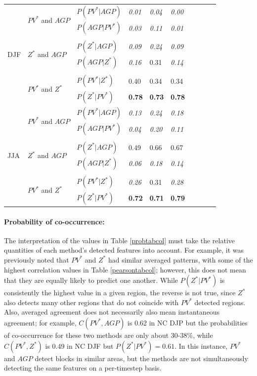 \documentclass[smallextended]{svjour3}       %
\numberwithin{equation}{section}
\begin{document}
\begin{table}
\begin{tabular}{|l|l|l|l|l|l|l|l|l|l|}
  \hline
  \multirow{8}{*}{DJF} 
   & \multirow{2}{*}{$PV^* $ and $AGP$}&$P(PV^*|AGP)$ & \textit{{0.01}} & \textit{{0.04} }& \textit{{0.00}} \\
   & & $P(AGP|PV^*)$ & \textit{{0.03}} & \textit{0.11}& \textit{{0.01}} \\ 
      &&&&&\\
   & \multirow{2}{*}{$Z^*$ and $AGP$} &$P(Z^*|AGP)$  & \textit{0.09} & \textit{{0.24}} & \textit{0.09} \\ 
   &&$P(AGP|Z^*)$  & \textit{{0.16} }& {{0.31} }& \textit{{0.14} }\\ 
      &&&&&\\
      & \multirow{2}{*}{$PV^*$ and $Z^*$ } &$P(PV^*|Z^*)$    & {0.40} & {0.34} & {0.34} \\
   &&$P(Z^*|PV^*)$   &\textbf{0.78} & \textbf{0.73} & \textbf{0.78} \\   
   \hline
\multirow{8}{*}{JJA} 
   & \multirow{2}{*}{$PV^* $ and $AGP$}&$P(PV^*|AGP)$ & \textit{0.13} & \textit{0.24} & \textit{0.18} \\  
   & & $P(AGP|PV^*)$  &\textit{{0.04}} & \textit{{0.20}} & \textit{{0.11}} \\ 
   &&&&&\\
   & \multirow{2}{*}{$Z^*$ and $AGP$} &$P(Z^*|AGP)$  & {0.49} & {0.66} & {0.67} \\  
   &&$P(AGP|Z^*)$    & \textit{{0.06}} & \textit{{0.18}} & \textit{{0.14}} \\ 
      &&&&&\\
      & \multirow{2}{*}{$PV^*$ and $Z^*$ } &$P(PV^*|Z^*)$    & \textit{{0.26}} & {{0.31}}& \textit{{0.28}} \\ 
   &&$P(Z^*|PV^*)$   & \textbf{{0.72}} & {\textbf{0.71}} & \textbf{0.79} \\ 
   
  \hline
\end{tabular}
\end{table}

\paragraph{Probability of co-occurrence:} The interpretation of the values in Table \ref{probtabcol} must take the relative quantities of each method's detected features into account. For example, it was previously noted that $PV^*$ and $Z^*$ had similar averaged patterns, with some of the highest correlation values in Table \ref{pearsontabcol}; however, this does not mean that they are equally likely to predict one another. While $P(Z^*|PV^*)$ is consistently the highest value in a given region, the reverse is not true, since $Z^*$ also detects many other regions that do not coincide with $PV^*$ detected regions. Also, averaged agreement does not necessarily also mean instantaneous agreement; for example, $C(PV^*, AGP)$ is 0.62 in NC DJP but the probabilities of co-occurrence for these two methods are only about 30-38\%, while $C(PV^*, Z^*)$ is 0.49 in NC DJF but $P(Z^*|PV^*)=0.61$. In this instance, $PV^*$ and $AGP$ detect blocks in similar areas, but the methods are not simultaneously detecting the same features on a per-timestep basis. 
\end{document}
